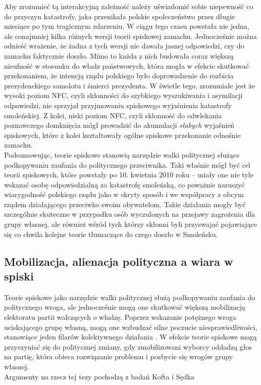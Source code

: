 \documentclass[man]{apa6}
\begin{document}
    Aby zrozumieć tą interakcyjną zależność należy uświadomić sobie niepewność co do przyczyn katastrofy, jaka przenikała polskie społeczeństwo przez długie miesiące po tym tragicznym zdarzeniu. W ciągu tego czasu powstała nie jedna, ale conajmniej kilka różnych wersji teorii spiskowej zamachu. Jednocześnie można odnieść wrażenie, że żadna z tych wersji nie dawała jasnej odpowiedzi, czy do zamachu faktycznie doszło. Mimo to każda z nich budowała coraz większą nieufność w stosunku do władz państwowych, która mogła w efekcie skutkować przekonaniem, że intencją rządu polskiego było doprowadzenie do rozbicia prezydenckiego samolotu i śmierci prezydenta. W świetle tego, zrozumiałe jest że wysoki poziom NFC, czyli skłonności do szybkiego wyszukiwania i asymilacji odpowiedzi, nie sprzyjał przyjmowaniu spiskowego wyjaśnienia katastrofy smoleńskiej. Z kolei, niski poziom NFC, czyli skłonność do odwlekania poznawczego domknięcia mógł prowadzić do akumulacji \emph{słabych} wyjaśnień spiskowych, które z kolei kształtowały ogólne spiskowe przekonanie odnośnie zamachu.\\
    Podsumowując, teorie spiskowe stanowią narzędzie walki politycznej służące podkopywaniu zaufania do politycznego przeciwnika. Taki właśnie mógł być cel teorii spiskowych, które powstały po 10. kwietnia 2010 roku -- miały one nie tyle wskazać osobę odpowiedzialną za katastrofę smoleńską, co poważnie naruszyć wiarygodność polskiego rządu jako w skryty sposób i we współpracy z obcym rządem działającego przeciwko swoim obywatelom. Takie działania mogły być szczególnie skuteczne w przypadku osób wyczulonych na przejawy zagrożenia dla grupy własnej, ale również wśród tych którzy skłonni byli przyswajać pojawiające się co chwila kolejne teorie tłumaczące do czego doszło w Smoleńsku.

    \subsection{Mobilizacja, alienacja polityczna a wiara w spiski}

    Teorie spiskowe jako narzędzie walki politycznej służą podkopywaniu zaufania do politycznego wroga, ale jednocześnie mogą one skutkować większą mobilizacją elektoratu partii walczących o władzę. Poprzez wskazanie potężnego wroga uciskającego grupę własną, mogą one wzbudzać silne poczucie niesprawiedliwości, stanowiące jeden filarów kolektywnego działania \parencite{van2008toward}. W efekcie teorie spiskowe mogą przyczyniać się do politycznej zmiany, gdy zmobilizowani wyborcy oddadzą głos na partię, która obieca rozwiązanie problemu i pozbycie się wrogów grupy własnej.\\
    Argumenty na rzecz tej tezy pochodzą z badań Kofta i Sędka
\end{document}
